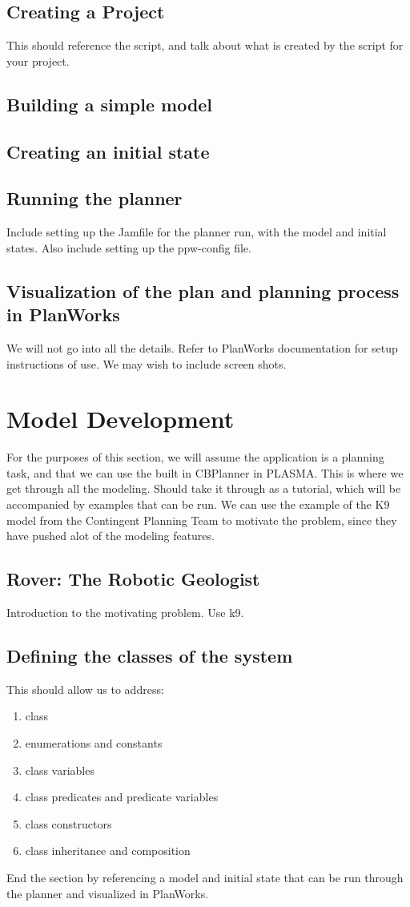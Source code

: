 \documentclass[10pt, letterpaper, twoside]{article}
\begin{document}
\subsection{Creating a Project}
This should reference the script, and talk about what is created by the script for your project.
\subsection{Building a simple model}
\subsection{Creating an initial state}
\subsection{Running the planner}
Include setting up the Jamfile for the planner run, with the model and initial states. Also include setting up the ppw-config file.
\subsection{Visualization of the plan and planning process in PlanWorks}
We will not go into all the details. Refer to PlanWorks documentation for setup instructions of use. We may wish to include screen shots.

\section{Model Development}
For the purposes of this section, we will assume the application is a planning task, and that we can use the built in CBPlanner in PLASMA.
This is where we get through all the modeling. Should take it through as a tutorial, which will be accompanied by examples that can be run. We can use the example of the K9 model from the Contingent Planning Team to motivate the problem, since they have pushed alot of the modeling features.

\subsection{Rover: The Robotic Geologist}
Introduction to the motivating problem. Use k9.

\subsection{Defining the classes of the system}
This should allow us to address:
\begin{enumerate}
\item class
\item enumerations and constants
\item class variables
\item class predicates and predicate variables
\item class constructors
\item class inheritance and composition
\end{enumerate}
End the section by referencing a model and initial state that can be run through the planner and visualized in PlanWorks.
\end{document}
